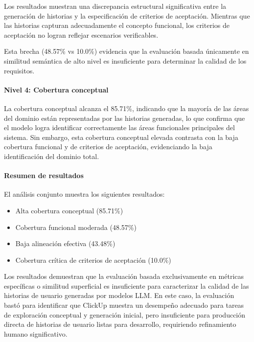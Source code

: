 Los resultados muestran una discrepancia estructural significativa entre la generación de historias y la especificación de criterios de aceptación. Mientras que las historias capturan adecuadamente el concepto funcional, los criterios de aceptación no logran reflejar escenarios verificables.

Esta brecha (48.57\% vs 10.0\%) evidencia que la evaluación basada únicamente en similitud semántica de alto nivel es insuficiente para determinar la calidad de los requisitos.

\paragraph{Nivel 4: Cobertura conceptual}

La cobertura conceptual alcanza el 85.71\%, indicando que la mayoría de las áreas del dominio están representadas por las historias generadas, lo que confirma que el modelo logra identificar correctamente las áreas funcionales principales del sistema. Sin embargo, esta cobertura conceptual elevada contrasta con la baja cobertura funcional y de criterios de aceptación, evidenciando la baja identificación del dominio total.

\paragraph{Resumen de resultados}

El análisis conjunto muestra los siguientes resultados:

\begin{itemize}
\item Alta cobertura conceptual (85.71\%)
\item Cobertura funcional moderada (48.57\%)
\item Baja alineación efectiva (43.48\%)
\item Cobertura crítica de criterios de aceptación (10.0\%)
\end{itemize}

Los resultados demuestran que la evaluación basada exclusivamente en métricas específicas o similitud superficial es insuficiente para caracterizar la calidad de las historias de usuario generadas por modelos LLM.
En este caso, la evaluación bastó para identificar que ClickUp muestra un desempeño adecuado para tareas de exploración conceptual y generación inicial, pero insuficiente para producción directa de historias de usuario listas para desarrollo, requiriendo refinamiento humano significativo.


